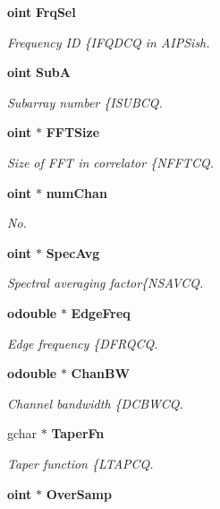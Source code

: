 \begin{CompactItemize}
{\bf oint} {\bf Frq\-Sel}
\begin{CompactList}\small\item\em Frequency ID \{IFQDCQ in AIPSish. \item\end{CompactList}\item 
{\bf oint} {\bf Sub\-A}
\begin{CompactList}\small\item\em Subarray number \{ISUBCQ. \item\end{CompactList}\item 
{\bf oint} $\ast$ {\bf FFTSize}
\begin{CompactList}\small\item\em Size of FFT in correlator \{NFFTCQ. \item\end{CompactList}\item 
{\bf oint} $\ast$ {\bf num\-Chan}
\begin{CompactList}\small\item\em No. \item\end{CompactList}\item 
{\bf oint} $\ast$ {\bf Spec\-Avg}
\begin{CompactList}\small\item\em Spectral averaging factor\{NSAVCQ. \item\end{CompactList}\item 
{\bf odouble} $\ast$ {\bf Edge\-Freq}
\begin{CompactList}\small\item\em Edge frequency \{DFRQCQ. \item\end{CompactList}\item 
{\bf odouble} $\ast$ {\bf Chan\-BW}
\begin{CompactList}\small\item\em Channel bandwidth \{DCBWCQ. \item\end{CompactList}\item 
gchar $\ast$ {\bf Taper\-Fn}
\begin{CompactList}\small\item\em Taper function \{LTAPCQ. \item\end{CompactList}\item 
{\bf oint} $\ast$ {\bf Over\-Samp}

\end{CompactItemize}

